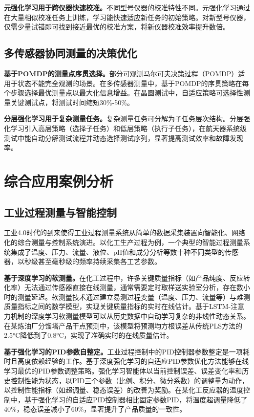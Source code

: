\documentclass[12pt,a4paper]{article}
\numberwithin{figure}{section}
\numberwithin{table}{section}
\numberwithin{equation}{section}
\begin{document}
\textbf{元强化学习用于跨仪器快速校准。}不同型号仪器的校准特性不同。元强化学习通过在大量相似校准任务上训练，学习能快速适应新任务的初始策略。对新型号仪器，仅需少量试错即可找到接近最优的校准方案，将新仪器校准效率提升数倍。

\subsection{多传感器协同测量的决策优化}

\textbf{基于POMDP的测量点序贯选择。}部分可观测马尔可夫决策过程（POMDP）适用于状态不能完全观测的场景。在多传感器测量中，基于POMDP的序贯策略在每个步骤选择最优测量点以最大化信息增益。在晶圆测试中，自适应策略可选择性测量关键测试点，将测试时间缩短30\%-50\%。

\textbf{分层强化学习用于复杂测量任务。}复杂测量任务可分解为子任务层次结构。分层强化学习引入高层策略（选择子任务）和低层策略（执行子任务），在航天器系统级测试中能自动分解测试流程并动态选择测试序列，显著提高测试效率和故障发现率。

\newpage

\section{综合应用案例分析}

\subsection{工业过程测量与智能控制}

工业4.0时代的到来使得工业过程测量系统从简单的数据采集装置向智能化、网络化的综合测量与控制系统演进。以化工生产过程为例，一个典型的智能过程测量系统集成了温度、压力、流量、液位、pH值和成分分析等数十种不同类型的传感器，以秒级甚至毫秒级的频率持续采集各工艺参数。

\textbf{基于深度学习的软测量。}在化工过程中，许多关键质量指标（如产品纯度、反应转化率）无法通过传感器直接在线测量，通常需要定时取样送实验室分析，存在数小时的测量延迟。软测量技术通过建立易测过程变量（温度、压力、流量等）与难测质量指标之间的数学模型，实现关键质量指标的实时在线估计。基于LSTM-注意力机制的深度学习软测量模型可以从历史数据中自动学习复杂的非线性动态关系。在某炼油厂分馏塔产品干点预测中，该模型将预测均方根误差从传统PLS方法的2.5°C降低到了0.8°C，实现了准确实时的在线质量估计。

\textbf{基于强化学习的PID参数自整定。}工业过程控制中的PID控制器参数整定是一项耗时且高度依赖经验的工作。基于深度强化学习的自适应PID参数优化方法能够在线学习最优的PID参数调整策略。强化学习智能体以当前控制误差、误差变化率和历史控制性能为状态，以PID三个参数（比例、积分、微分系数）的调整量为动作，以控制性能指标（如超调量、稳态误差）的改善为奖励。在某化工反应器的温度控制中，基于强化学习的自适应PID控制器相比固定参数PID，将温度超调量降低了40\%，稳态误差减小了60\%，显著提升了产品质量的一致性。
\end{document}
